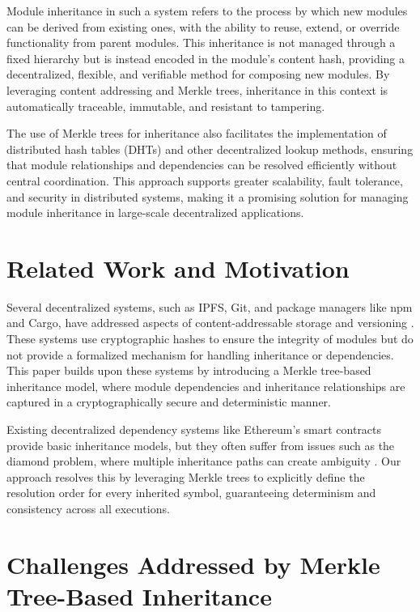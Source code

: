 \documentclass[sigplan,screen]{acmart}
\begin{document}
Module inheritance in such a system refers to the process by which new modules can be derived from existing ones, with the ability to reuse, extend, or override functionality from parent modules. This inheritance is not managed through a fixed hierarchy but is instead encoded in the module's content hash, providing a decentralized, flexible, and verifiable method for composing new modules. By leveraging content addressing and Merkle trees, inheritance in this context is automatically traceable, immutable, and resistant to tampering.

The use of Merkle trees for inheritance also facilitates the implementation of distributed hash tables (DHTs) and other decentralized lookup methods, ensuring that module relationships and dependencies can be resolved efficiently without central coordination. This approach supports greater scalability, fault tolerance, and security in distributed systems, making it a promising solution for managing module inheritance in large-scale decentralized applications.

\section{Related Work and Motivation}
Several decentralized systems, such as IPFS, Git, and package managers like npm and Cargo, have addressed aspects of content-addressable storage and versioning \cite{benet2014}\cite{git}\cite{cargo_docs}\cite{npm_docs}. These systems use cryptographic hashes to ensure the integrity of modules but do not provide a formalized mechanism for handling inheritance or dependencies. This paper builds upon these systems by introducing a Merkle tree-based inheritance model, where module dependencies and inheritance relationships are captured in a cryptographically secure and deterministic manner.

Existing decentralized dependency systems like Ether\-eum's smart contracts provide basic inheritance models, but they often suffer from issues such as the diamond problem, where multiple inheritance paths can create ambiguity \cite{solidity_inheritance}\cite{snyder1986}. Our approach resolves this by leveraging Merkle trees to explicitly define the resolution order for every inherited symbol, guaranteeing determinism and consistency across all executions.

\section{Challenges Addressed by Merkle Tree-Based Inheritance}
\label{sec:challenges}
\end{document}
